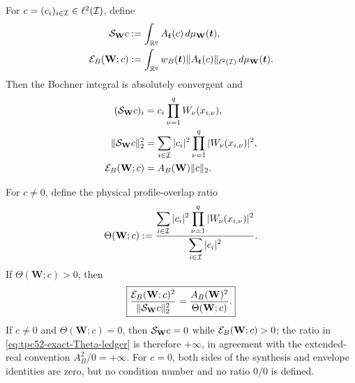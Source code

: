 \begin{theorem}
\label{thm:tpc52-diagonal-Mellin}
\label{thm:tpc52-diagonal-ledger}
For \(c=(c_i)_{i\in\mathcal I}\in\ell^2(\mathcal I)\), define
\begin{align}
 \mathcal S_{\mathbf W}c
 &:=\int_{\mathbb R^q}A_{\bm t}(c)\,
       d\mu_{\mathbf W}(\bm t),
 \label{eq:tpc52-diagonal-Mellin-synthesis}\\
 \mathcal E_B(\mathbf W;c)
 &:=\int_{\mathbb R^q}w_B(\bm t)
       \|A_{\bm t}(c)\|_{\ell^2(\mathcal I)}
       \,d\mu_{\mathbf W}(\bm t).
 \label{eq:tpc52-diagonal-Mellin-envelope}
\end{align}
Then the Bochner integral is absolutely convergent and
\begin{align}
 (\mathcal S_{\mathbf W}c)_i
 &=c_i\prod_{\nu=1}^qW_\nu(x_{i,\nu}),
 \label{eq:tpc52-diagonal-output}\\
 \|\mathcal S_{\mathbf W}c\|_2^2
 &=\sum_{i\in\mathcal I}|c_i|^2
   \prod_{\nu=1}^q|W_\nu(x_{i,\nu})|^2,
 \label{eq:tpc52-diagonal-output-energy}\\
 \mathcal E_B(\mathbf W;c)
 &=A_B(\mathbf W)\|c\|_2.
 \label{eq:tpc52-exact-envelope-equality}
\end{align}

For \(c\ne0\), define the physical profile-overlap ratio
\begin{equation}
 \Theta(\mathbf W;c)
 :=\frac{
   \displaystyle\sum_{i\in\mathcal I}|c_i|^2
    \prod_{\nu=1}^q|W_\nu(x_{i,\nu})|^2}
   {\displaystyle\sum_{i\in\mathcal I}|c_i|^2}.
 \label{eq:tpc52-profile-overlap-ratio}
\end{equation}
If \(\Theta(\mathbf W;c)>0\), then
\begin{equation}
 \boxed{
 \frac{\mathcal E_B(\mathbf W;c)^2}
      {\|\mathcal S_{\mathbf W}c\|_2^2}
 =\frac{A_B(\mathbf W)^2}{\Theta(\mathbf W;c)}.}
 \label{eq:tpc52-exact-Theta-ledger}
\end{equation}
If \(c\ne0\) and \(\Theta(\mathbf W;c)=0\), then
\(\mathcal S_{\mathbf W}c=0\) while
\(\mathcal E_B(\mathbf W;c)>0\); the ratio in
\eqref{eq:tpc52-exact-Theta-ledger} is therefore \(+\infty\), in
agreement with the extended-real convention \(A_B^2/0=+\infty\).
For \(c=0\), both sides of the synthesis and envelope identities are
zero, but no condition number and no ratio \(0/0\) is defined.
\end{theorem}

